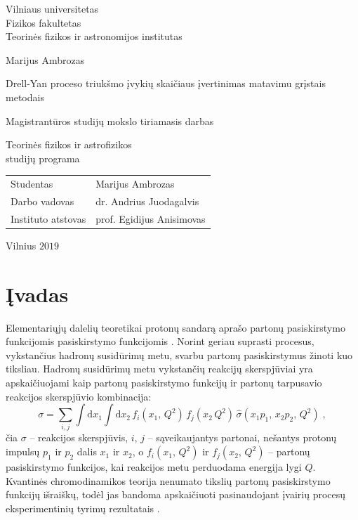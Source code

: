\documentclass[a4paper, 12pt, oneside]{article}
\newlength\q
\begin{document}

\begin{titlepage}
\centering
{\large Vilniaus universitetas \\ Fizikos fakultetas \\ Teorinės fizikos ir astronomijos institutas \par}
\vspace{3.5cm}
{\Large Marijus Ambrozas \par}
\vspace{0.3cm}
{\Large Drell-Yan proceso triukšmo įvykių skaičiaus įvertinimas matavimu grįstais metodais \par}
\vspace{0.8cm}
{\large Magistrantūros studijų mokslo tiriamasis darbas \par}
\vspace{0.8cm}
{\large Teorinės fizikos ir astrofizikos \\ studijų programa \par}
\vspace{3.5cm}
{\large \begin{tabular*}{0.9\textwidth}{@{\extracolsep{\fill}}ll}
Studentas & Marijus Ambrozas\tabularnewline[0.5cm]
Darbo vadovas & dr. Andrius Juodagalvis\tabularnewline[0.5cm]
Instituto atstovas & prof. Egidijus Anisimovas\tabularnewline[0.5cm]
\end{tabular*} \par}
\vspace{4cm}
{\large Vilnius $2019$\par}
\end{titlepage}


\clearpage
\tableofcontents
\clearpage

\section{Įvadas}%

Elementariųjų dalelių teoretikai protonų sandarą aprašo partonų pasiskirstymo funkcijomis pasiskirstymo funkcijomis \cite{NNPDF}.
Norint geriau suprasti procesus, vykstančius hadronų susidūrimų metu, svarbu partonų pasiskirstymus žinoti kuo tiksliau.
Hadronų susidūrimų metu vykstančių reakcijų skerspjūviai yra apskaičiuojami kaip partonų pasiskirstymo
funkcijų ir partonų tarpusavio reakcijos skerspjūvio kombinacija:
\begin{equation}
	\sigma = \sum_{i, j} \int \mathrm{d}x_1 \int \mathrm{d}x_2 \,
	f_{i}(x_1, \, Q^2) \, f_{j}(x_2 \, Q^2) \, \hat{\sigma}(x_1 p_1, \, x_2 p_2, \, Q^2) \; \mathrm{,}
	\label{eq:PDFxsec}
\end{equation}
čia $\sigma$ -- reakcijos skerspjūvis, $i$, $j$ -- sąveikaujantys partonai, nešantys protonų impulsų $p_1$ ir $p_2$
dalis $x_1$ ir $x_2$, o $f_{i}(x_1, \, Q^2)$ ir $f_{j}(x_2, \, Q^2)$ -- partonų pasiskirstymo funkcijos, kai
reakcijos metu perduodama energija lygi $Q$.
Kvantinės chromodinamikos teorija nenumato tikslių partonų pasiskirstymo funkcijų išraiškų, todėl jas bandoma
apskaičiuoti pasinaudojant įvairių procesų eksperimentinių tyrimų rezultatais \cite{NNPDF, PDF_CTEQ, PDF_ABMP16}.
\end{document}
